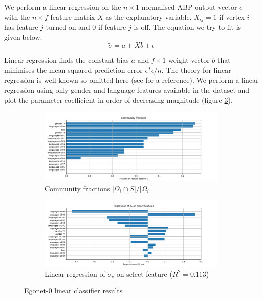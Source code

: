 \documentclass[]{article}
\newcommand{\figwidth}{\linewidth}
\begin{document}
\begin{multicols*}{2}
We perform a linear regression on the $n \times 1$ normalised ABP output vector $\tilde{\sigma}$ with the $n \times f$ feature matrix $X$ as the explanatory variable. $X_{ij} = 1$ if vertex $i$ has feature $j$ turned on and $0$ if feature $j$ is off. The equation we try to fit is given below:
%
\begin{equation}
	\tilde{\sigma} = a + X b + \epsilon
	\label{eqn:lin-regression}
\end{equation}

Linear regression finds the constant bias $a$ and $f \times 1$ weight vector $b$ that minimises the mean squared prediction error $\epsilon^T \epsilon / n$. The theory for linear regression is well known so omitted here (see \cite{yale-linear-regression} for a reference). We perform a linear regression using only gender and language features available in the dataset and plot the parameter coefficient in order of decreasing magnitude (figure \ref{fig:abp-output-lin-regression}).
%
\begin{figure}[H]
	\centering
	\begin{subfigure}{\figwidth}
		\includegraphics[width=\linewidth]{ego-0-abp-community-fractions.png}
		\caption{Community fractions $|\Omega_i \cap S| / |\Omega_i|$}
		\label{fig:abp-output-community-fractions}
	\end{subfigure}
	\begin{subfigure}{\figwidth}
		\includegraphics[width=\linewidth]{ego-0-abp-lin-regression.png}
		\caption{Linear regression of $\tilde{\sigma}_v$ on select feature ($R^2 = 0.113$)}
		\label{fig:abp-output-lin-regression}
	\end{subfigure}
	\caption{Egonet-0 linear classifier results}
\end{figure}


\end{multicols*}
\end{document}
